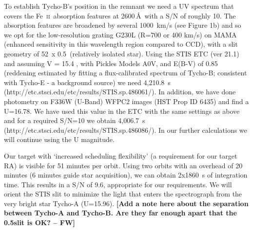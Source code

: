 \documentclass[12pt]{article}
\newcommand{\feii}{Fe~\textsc{ii}}
\begin{document}
To establish Tycho-B's position in the remnant we need a UV spectrum that covers the \feii\ absorption features at 2600\,\AA\ with a S/N of roughly 10. The absorption features are broadened by several 1000~km/s (see Figure 1b) and so we opt for the low-resolution grating G230L (R=700 or 400 km/s) on MAMA (enhanced sensitivity in this wavelength region compared to CCD), with a slit geometry of 52\arcsec\ x 0.5\arcsec\ (relatively isolated star). Using the STIS ETC (ver 21.1) and assuming V = 15.4 \citep{2004Natur.431.1069R}, with Pickles Models A0V, and E(B-V) of 0.85 (reddening estimated by fitting a flux-calibrated spectrum of Tycho-B; consistent with Tycho-E - a background source) we need  4,210.8~s (http://etc.stsci.edu/etc/results/STIS.sp.486061/). 
In addition, we have done photometry on F336W (U-Band) WFPC2 images (HST Prop ID 6435) and find a U=16.78. We have used this value in the ETC with the same settings as above and for a required S/N=10 we obtain 4,006.7~s (http://etc.stsci.edu/etc/results/STIS.sp.486086/). In our further calculations we will continue using the U magnitude.


Our target with `increased scheduling flexibility' (a requirement for our target RA) is visible for 51 minutes per orbit. Using two orbits with an overhead of 20 minutes (6 minutes guide star acquisition), we can obtain 2x1860~s of integration time. This results in a S/N of  9.6, appropriate for our requirements. We will orient the STIS slit to minimize the light that enters the spectrograph from the very bright star Tycho-A (U=15.96).   {\bf[Add a note here about the separation between Tycho-A and Tycho-B.  Are they far enough apart that the 0.5\arcsec slit is OK? -- FW]}



%
%
\specialreq             %


%
%
\coordinatedobs          %


%
%
\duplications           %
\end{document}
